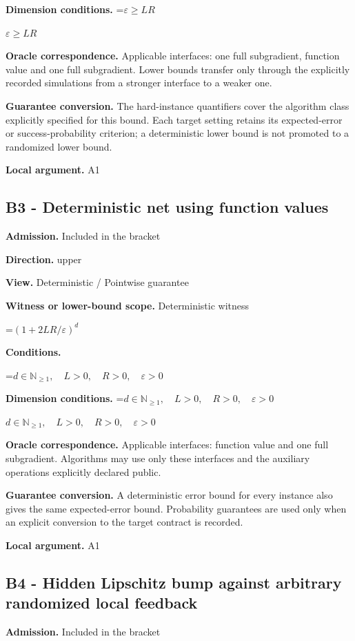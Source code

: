 \documentclass[10pt,a4paper]{article}
\newcommand{\AtlasMath}[1]{\par\begingroup\centering\setbox0=\hbox{$\displaystyle #1$}\ifdim\wd0>1.4\linewidth\typeout{ATLAS WIDE FORMULA: \the\wd0}\fi\ifdim\wd0>\linewidth\resizebox{\linewidth}{!}{\box0}\else\box0\fi\par\endgroup}
\newcommand{\AtlasInlineMath}[1]{\begingroup\setbox0=\hbox{$#1$}\ifdim\wd0>.4\linewidth\endgroup\AtlasMath{#1}\else\endgroup$#1$\fi}
\begin{document}
\textbf{Dimension conditions.} \AtlasInlineMath{\varepsilon\ge LR}

\textbf{Oracle correspondence.} Applicable interfaces: one full subgradient, function value and one full subgradient. Lower bounds transfer only through the explicitly recorded simulations from a stronger interface to a weaker one.

\textbf{Guarantee conversion.} The hard-instance quantifiers cover the algorithm class explicitly specified for this bound. Each target setting retains its expected-error or success-probability criterion; a deterministic lower bound is not promoted to a randomized lower bound.

\textbf{Local argument.} A1

\subsection{B3 - Deterministic net using function values}
\textbf{Admission.} Included in the bracket

\textbf{Direction.} upper

\textbf{View.} Deterministic / Pointwise guarantee

\textbf{Witness or lower-bound scope.} Deterministic witness

\AtlasMath{(1+2LR/\varepsilon)^d}
\textbf{Conditions.} 
\AtlasMath{d\in\mathbb{N}_{\ge1},\quad L>0,\quad R>0,\quad \varepsilon>0}


\textbf{Dimension conditions.} \AtlasInlineMath{d\in\mathbb{N}_{\ge1},\quad L>0,\quad R>0,\quad \varepsilon>0}

\textbf{Oracle correspondence.} Applicable interfaces: function value and one full subgradient. Algorithms may use only these interfaces and the auxiliary operations explicitly declared public.

\textbf{Guarantee conversion.} A deterministic error bound for every instance also gives the same expected-error bound. Probability guarantees are used only when an explicit conversion to the target contract is recorded.

\textbf{Local argument.} A1

\subsection{B4 - Hidden Lipschitz bump against arbitrary randomized local feedback}
\textbf{Admission.} Included in the bracket
\end{document}
